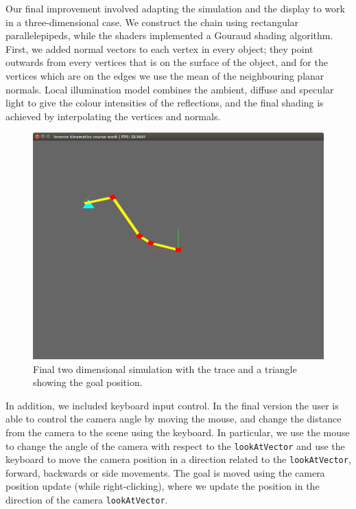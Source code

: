 \documentclass[paper=a4, fontsize=11pt]{scrartcl} %
\numberwithin{equation}{section} %
\numberwithin{figure}{section} %
\numberwithin{table}{section} %
\begin{document}
Our final improvement involved adapting the simulation and the display to work in a three-dimensional case. We construct the chain using rectangular parallelepipeds, while the shaders implemented a Gouraud shading algorithm. First, we added normal vectors to each vertex in every object; they point outwards from every vertices that is on the surface of the object, and for the vertices which are on the edges we use the mean of the neighbouring planar normals. Local illumination model combines the ambient, diffuse and specular light to give the colour intensities of the reflections, and the final shading is achieved by interpolating the vertices and normals. \\
\begin{center}
\begin{figure}[h]
\includegraphics[scale=0.4]{chain2Dv2}
\caption{Final two dimensional simulation with the trace and a triangle showing the goal position.}
\end{figure}
\end{center}

In addition, we included keyboard input control. In the final version the user is able to control the camera angle by moving the mouse, and change the distance from the camera to the scene using the keyboard. In particular, we use the mouse to change the angle of the camera with respect to the \texttt{lookAtVector} and use the keyboard to move the camera position in a direction related to the \texttt{lookAtVector}, forward, backwards or side movements. The goal is moved using the camera position update (while right-clicking), where we update the position in the direction of the camera \texttt{lookAtVector}.\\
\end{document}

